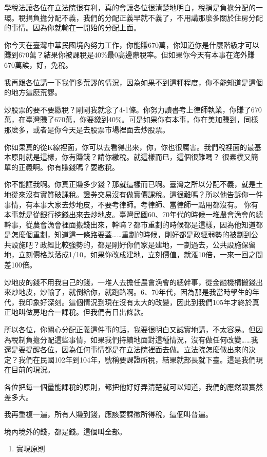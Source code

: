 \documentclass[]{ctexbook}
\providecommand{\tightlist}{%
  \setlength{\itemsep}{0pt}\setlength{\parskip}{0pt}}
\begin{document}
學稅法讓各位在立法院很有利，真的會讓各位很清楚地明白，稅捐是負擔分配的一環。稅捐負擔分配不義，我們的分配正義早就不義了，不用講那麼多關於住房分配的事情。因為你就輸在一開始的分配上面。

你今天在臺灣中華民國境內努力工作，你能賺670萬，你知道你是什麼階級才可以賺到670萬？結果你被課稅是40\%最0高邊際稅率。但如果你今天有本事在海外賺670萬誒，好，免稅。

我再跟各位講一下我們多荒謬的情況，因為如果不到這種程度，你不能知道是這個的地方這麽荒謬。

炒股票的要不要繳稅？剛剛我就念了4-1條。你努力讀書考上律師執業，你賺了670萬，在臺灣賺了670萬，你要繳到40\%。可是如果你有本事，你在美加賺到，同樣那麽多，或者是你今天是去股票市場裡面去炒股票。

你如果真的從K線裡面，你可以去看得出來，你，你也很厲害。我們稅裡面的最基本原則就是這樣，你有賺錢？請你繳稅。就這樣而已，這個很難嗎？ 很素樸又簡單的正義啊。你有賺錢嗎？要繳稅。

你不能誆我啊。你真正賺多少錢？那就這樣而已啊。臺灣之所以分配不義，就是土地從來沒有實質破課稅。證券交易沒有做實價課稅。這很難嗎？所以他告訴你一件事情，有本事大家去炒地皮，不要考律師。考律師、當律師一點用都沒有。
你有本事就是從銀行挖錢出來去炒地皮。臺灣民國60、70年代的時候一堆農會漁會的總幹事，從農會漁會裡面搬錢出來，幹嘛？都市重劃的時候都是這樣，因為他知道都是怎麼個重劃，知道這一條路要蓋\ldots\ldots 重劃的時候，剛好都是政經弱勢的被劃到公共設施吧？政經比較強勢的，都是剛好你們家是建地，一劃過去，公共設施保留地，立刻價格跌落成1/10，如果你改成建地，立刻價值，就漲10倍，一來一回之間差100倍。

炒地皮的錢不用我自己的錢，一堆人去擔任農會漁會的總幹事，從金融機構搬錢出來炒地皮，炒輸了，就倒給你，就跑路啊。6、70年代，因為那是我當時學生的年代，我印象好深刻。這個情況到現在沒有太大的改變，因此到我們105年才終於真正地叫做房地合一課稅。但我們有日出條款。

所以各位，你關心分配正義這件事的話，我要很明白又誠實地講，不太容易。但因為稅制負擔分配這些事情，如果我們持續地面對這種情況，沒有做任何改變\ldots\ldots 我還是要提醒各位，因為任何事情都是在立法院裡面去做。立法院怎麼做出來的決定？我們在民國102年到104年，號稱要課證所稅，結果就部長就下臺。這是我們現在目前的現況。

各位把每一個量能課稅的原則，都把他好好弄清楚就可以知道，我們的應然跟實然差多大。

我再重複一遍，所有人賺到錢，應該要課徵所得稅，這個叫普遍。

境內境外的錢，都是錢。這個叫全部。

\begin{enumerate}
\def\labelenumi{\arabic{enumi}.}
\setcounter{enumi}{2}
\tightlist
\item
  實現原則
\end{enumerate}
\end{document}
